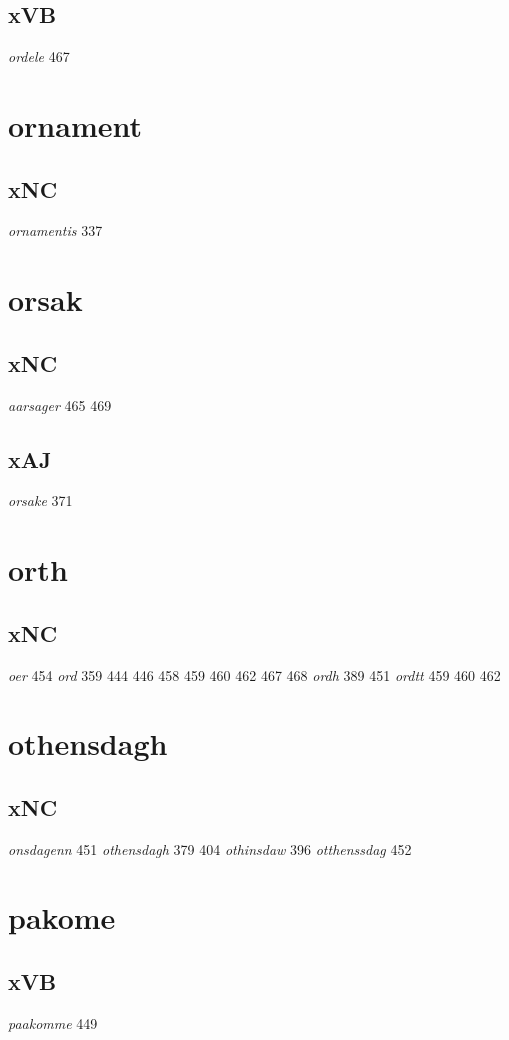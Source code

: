 \documentclass[a4paper,twocolumn]{article}
\begin{document}
\subsection{xVB}
\label{sec:org17cb39a}
\emph{ordele} 467 
\section{ornament}
\label{sec:orgbce14aa}
\subsection{xNC}
\label{sec:orgfe6f528}
\emph{ornamentis} 337 
\section{orsak}
\label{sec:org88b1d76}
\subsection{xNC}
\label{sec:orgde21486}
\emph{aarsager} 465 469 
\subsection{xAJ}
\label{sec:org236b718}
\emph{orsake} 371 
\section{orth}
\label{sec:org1ba01c7}
\subsection{xNC}
\label{sec:org340f684}
\emph{oer} 454 \emph{ord} 359 444 446 458 459 460 462 467 468 \emph{ordh} 389 451 \emph{ordtt} 459 460 462 
\section{othensdagh}
\label{sec:org15fbe14}
\subsection{xNC}
\label{sec:org3ddc055}
\emph{onsdagenn} 451 \emph{othensdagh} 379 404 \emph{othinsdaw} 396 \emph{otthenssdag} 452 
\section{pakome}
\label{sec:orge939de2}
\subsection{xVB}
\label{sec:org4614ac1}
\emph{paakomme} 449 
\end{document}
